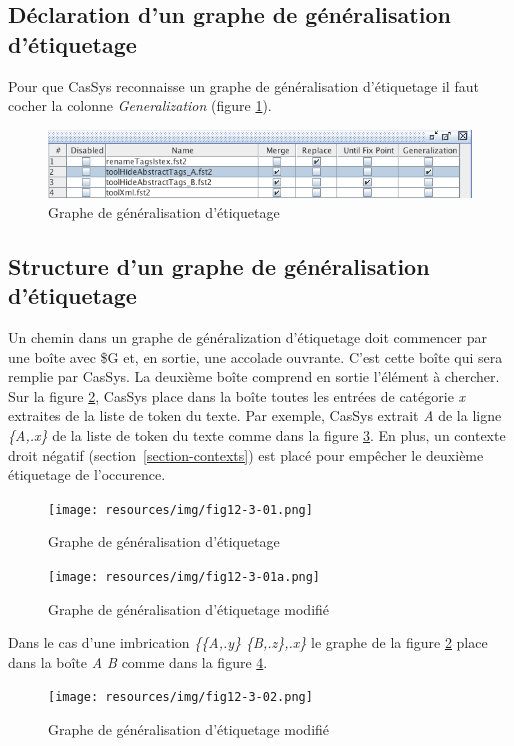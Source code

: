 \subsection{D\'{e}claration d'un graphe de g\'{e}n\'{e}ralisation d'\'{e}tiquetage}
Pour que CasSys reconnaisse un graphe de g\'{e}n\'{e}ralisation d'\'{e}tiquetage il faut cocher la colonne \emph{Generalization} (figure \ref{fig12-3}).
\begin{figure}[!htb]
  \centering
  \includegraphics[width=15cm]{resources/img/fig12-3.png}
  \caption{Graphe de g\'{e}n\'{e}ralisation d'\'{e}tiquetage}
  \label{fig12-3}
\end{figure}

\subsection{Structure d'un graphe de g\'{e}n\'{e}ralisation d'\'{e}tiquetage}
Un chemin dans un graphe de g\'{e}n\'{e}ralization d'\'{e}tiquetage doit commencer par une bo\^{i}te avec \$G et, en sortie, une accolade ouvrante. C'est cette bo\^{i}te qui sera remplie par CasSys. La deuxi\`{e}me bo\^{i}te comprend en sortie l'\'{e}l\'{e}ment \`{a} chercher. Sur la figure \ref{fig12-3-01}, CasSys place dans la bo\^{i}te toutes les entr\'{e}es de cat\'{e}gorie \textit{x} extraites de la liste de token du texte. Par exemple, CasSys extrait \textit{A} de la ligne \emph{\{A,.x\}} de la liste de token du texte comme dans la figure \ref{fig12-3-01a}. En plus, un contexte droit n\'{e}gatif (section~\ref{section-contexts}) est plac\'{e} pour emp\^{e}cher le  deuxi\`{e}me \'{e}tiquetage de l'occurence.
\begin{figure}[!htb]
  \centering
  \texttt{[image: resources/img/fig12-3-01.png]}
  \caption{Graphe de g\'{e}n\'{e}ralisation d'\'{e}tiquetage}
  \label{fig12-3-01}
\end{figure}
\begin{figure}[!htb]
  \centering
  \texttt{[image: resources/img/fig12-3-01a.png]}
  \caption{Graphe de g\'{e}n\'{e}ralisation d'\'{e}tiquetage modifi\'{e}}
  \label{fig12-3-01a}
\end{figure}


Dans le cas d'une imbrication \emph{\{\{A,.y\} \{B,.z\},.x\}} le graphe de la figure \ref{fig12-3-01} place dans la bo\^{i}te \textit{A B} comme dans la figure \ref{fig12-3-02}.
\begin{figure}[!htb]
  \centering
  \texttt{[image: resources/img/fig12-3-02.png]}
  \caption{Graphe de g\'{e}n\'{e}ralisation d'\'{e}tiquetage modifi\'{e}}
  \label{fig12-3-02}
\end{figure}


